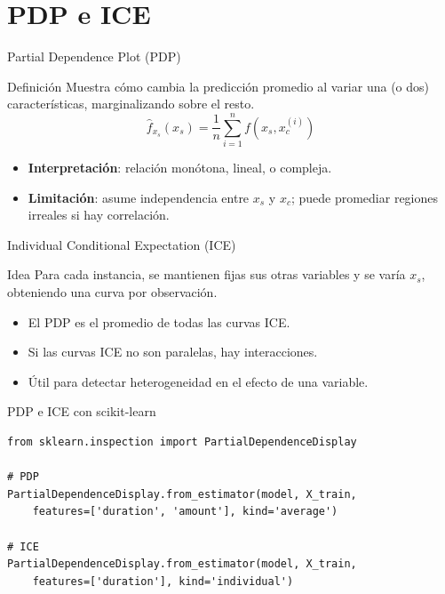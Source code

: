 \documentclass[aspectratio=169, 10pt, xcolor=table]{beamer}
\begin{document}
\section{PDP e ICE}

\begin{frame}{Partial Dependence Plot (PDP)}
    \begin{block}{Definición}
        Muestra cómo cambia la predicción promedio al variar una (o dos) características, marginalizando sobre el resto.
        \[
        \widehat{f}_{x_s}(x_s) = \frac{1}{n}\sum_{i=1}^{n} f(x_s, x_c^{(i)})
        \]
    \end{block}
    \begin{itemize}
        \item \textbf{Interpretación}: relación monótona, lineal, o compleja.
        \item \textbf{Limitación}: asume independencia entre $x_s$ y $x_c$; puede promediar regiones irreales si hay correlación.
    \end{itemize}
\end{frame}

\begin{frame}{Individual Conditional Expectation (ICE)}
    \begin{block}{Idea}
        Para cada instancia, se mantienen fijas sus otras variables y se varía $x_s$, obteniendo una curva por observación.
    \end{block}
    \begin{itemize}
        \item El PDP es el promedio de todas las curvas ICE.
        \item Si las curvas ICE no son paralelas, hay interacciones.
        \item Útil para detectar heterogeneidad en el efecto de una variable.
    \end{itemize}
\end{frame}

\begin{frame}[fragile]{PDP e ICE con scikit-learn}
    \begin{lstlisting}
from sklearn.inspection import PartialDependenceDisplay

# PDP
PartialDependenceDisplay.from_estimator(model, X_train,
    features=['duration', 'amount'], kind='average')

# ICE
PartialDependenceDisplay.from_estimator(model, X_train,
    features=['duration'], kind='individual')
    \end{lstlisting}
\end{frame}
\end{document}

